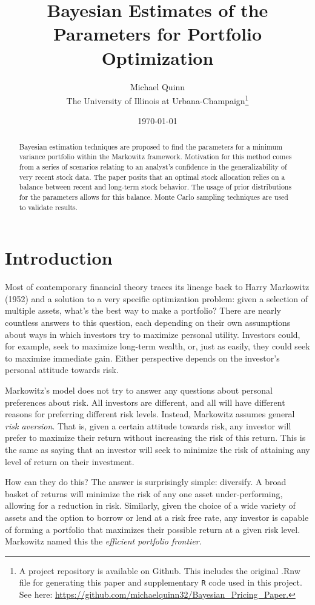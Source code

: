\documentclass[a4paper]{article}\usepackage[]{graphicx}\usepackage[]{color}
\title{Bayesian Estimates of the Parameters for Portfolio Optimization}
\date{\today}
\author{Michael Quinn \\ The University of Illinois at Urbana-Champaign\footnote{A project repository is available on Github. This includes the original .Rnw file for generating this paper and supplementary \texttt{R} code used in this project. See here: \url{https://github.com/michaelquinn32/Bayesian_Pricing_Paper.}}}
\begin{document}
\maketitle

\begin{abstract}
Bayesian estimation techniques are proposed to find the parameters for a minimum variance portfolio within the Markowitz framework. Motivation for this method comes from a series of scenarios relating to an analyst's confidence in the generalizability of  very recent stock data. The paper posits that an optimal stock allocation relies on a balance between recent and long-term stock behavior. The usage of prior distributions for the parameters allows for this balance. Monte Carlo sampling techniques are used to validate results.
\end{abstract}

\section{Introduction}

Most of contemporary financial theory traces its lineage back to Harry Markowitz (1952) \cite{mark52} and a solution to a very specific optimization problem: given a selection of multiple assets, what's the best way to make a portfolio? There are nearly countless answers to this question, each depending on their own assumptions about ways in which investors try to maximize personal utility. Investors could, for example, seek to maximize long-term wealth, or, just as easily, they could seek to maximize immediate gain. Either perspective depends on the investor's personal attitude towards risk.

Markowitz's model does not try to answer any questions about personal preferences about risk. All investors are different, and all will have different reasons for preferring different risk levels. Instead, Markowitz assumes general \textit{risk aversion}. That is, given a certain attitude towards risk, any investor will prefer to maximize their return without increasing the risk of this return. This is the same as saying that an investor will seek to minimize the risk of attaining any level of return on their investment.

How can they do this? The answer is surprisingly simple: diversify. A broad basket of returns will minimize the risk of any one asset under-performing, allowing for a reduction in risk. Similarly, given the choice of a wide variety of assets and the option to borrow or lend at a risk free rate, any investor is capable of forming a portfolio that maximizes their possible return at a given risk level. Markowitz named this the \textit{efficient portfolio frontier}.
\end{document}
